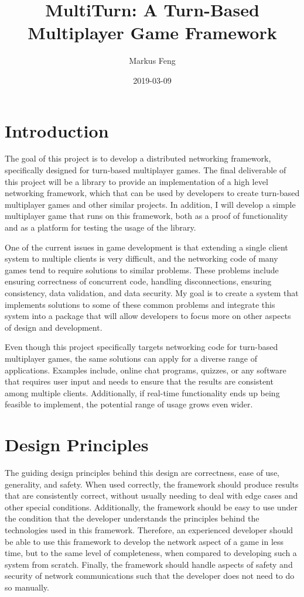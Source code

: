 \documentclass{article}
\title{MultiTurn: A Turn-Based Multiplayer Game Framework}
\author{Markus Feng}
\date{2019-03-09}
\begin{document}
\maketitle

\section{Introduction}
The goal of this project is to develop a distributed networking framework, specifically designed for turn-based multiplayer games. The final deliverable of this project will be a library to provide an implementation of a high level networking framework, which that can be used by developers to create turn-based multiplayer games and other similar projects. In addition, I will develop a simple multiplayer game that runs on this framework, both as a proof of functionality and as a platform for testing the usage of the library.

One of the current issues in game development is that extending a single client system to multiple clients is very difficult, and the networking code of many games tend to require solutions to similar problems. These problems include ensuring correctness of concurrent code, handling disconnections, ensuring consistency, data validation, and data security. My goal is to create a system that implements solutions to some of these common problems and integrate this system into a package that will allow developers to focus more on other aspects of design and development.

Even though this project specifically targets networking code for turn-based multiplayer games, the same solutions can apply for a diverse range of applications. Examples include, online chat programs, quizzes, or any software that requires user input and needs to ensure that the results are consistent among multiple clients. Additionally, if real-time functionality ends up being feasible to implement, the potential range of usage grows even wider.

\section{Design Principles}
The guiding design principles behind this design are correctness, ease of use, generality, and safety. When used correctly, the framework should produce results that are consistently correct, without usually needing to deal with edge cases and other special conditions. Additionally, the framework should be easy to use under the condition that the developer understands the principles behind the technologies used in this framework. Therefore, an experienced developer should be able to use this framework to develop the network aspect of a game in less time, but to the same level of completeness, when compared to developing such a system from scratch. Finally, the framework should handle aspects of safety and security of network communications such that the developer does not need to do so manually.
\end{document}
